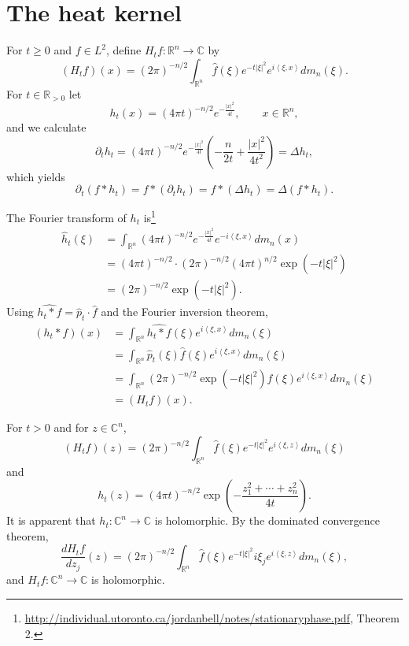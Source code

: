 \documentclass{article}
\newcommand{\inner}[2]{\left\langle #1, #2 \right\rangle}
\theoremstyle{definition}
\begin{document}
\section{The heat kernel}
For $t \geq 0$ and $f \in L^2$, define $H_t f:\mathbb{R}^n \to \mathbb{C}$ by
\[
(H_t f)(x)  = (2\pi)^{-n/2} \int_{\mathbb{R}^n} \widehat{f}(\xi) e^{-t |\xi|^2} e^{i\inner{\xi}{x}} dm_n(\xi).
\]
For $t \in \mathbb{R}_{>0}$ let
\[
h_t(x) = (4\pi t)^{-n/2} e^{-\frac{|x|^2}{4t}},\qquad x \in \mathbb{R}^n,
\]
and we calculate
\[
\partial_t h_t = (4\pi t)^{-n/2} e^{-\frac{|x|^2}{4t}} \left( -\frac{n}{2t}+\frac{|x|^2}{4t^2}\right)
=\Delta h_t,
\]
which yields
\[
\partial_t ( f* h_t) = f*(\partial_t h_t) = f*(\Delta h_t)
=\Delta (f*h_t).
\]

The Fourier transform of $h_t$ is\footnote{\url{http://individual.utoronto.ca/jordanbell/notes/stationaryphase.pdf}, 
Theorem 2.}
\begin{align*}
\widehat{h}_t(\xi)&= \int_{\mathbb{R}^n} (4\pi t)^{-n/2}
e^{-\frac{|x|^2}{4t}} e^{-i\inner{\xi}{x}} dm_n(x)\\
&=(4\pi t)^{-n/2} \cdot (2\pi)^{-n/2} (4\pi t)^{n/2} \exp(-t|\xi|^2)\\
&=(2\pi)^{-n/2} \exp(-t|\xi|^2).
\end{align*}
Using $\widehat{h_t*f}= \widehat{p}_t \cdot \widehat{f}$ and the Fourier inversion theorem,
\begin{align*}
(h_t*f)(x)&= \int_{\mathbb{R}^n} \widehat{h_t*f}(\xi)e^{i\inner{\xi}{x}} dm_n(\xi)\\
&=\int_{\mathbb{R}^n} \widehat{p}_t(\xi) \widehat{f}(\xi) e^{i\inner{\xi}{x}} dm_n(\xi)\\
&=\int_{\mathbb{R}^n} (2\pi)^{-n/2} \exp(-t|\xi|^2) \widehat{f}(\xi) e^{i\inner{\xi}{x}} dm_n(\xi)\\
&=(H_t f)(x).
\end{align*}

For $t>0$ and for $z \in \mathbb{C}^n$,
\[
(H_t f)(z) = (2\pi)^{-n/2} \int_{\mathbb{R}^n} \widehat{f}(\xi) e^{-t|\xi|^2} e^{i\inner{\xi}{z}} dm_n(\xi)
\]
and
\[
h_t(z) = (4\pi t)^{-n/2} \exp\left(-\frac{z_1^2+\cdots+z_n^2}{4t}\right).
\]
It is apparent that $h_t:\mathbb{C}^n \to \mathbb{C}$ is holomorphic. 
By the dominated convergence theorem,
\[
\frac{d H_t f}{dz_j} (z) = (2\pi)^{-n/2} \int_{\mathbb{R}^n} \widehat{f}(\xi) e^{-t|\xi|^2} i\xi_j e^{i\inner{\xi}{z}} dm_n(\xi),
\]
and $H_t f:\mathbb{C}^n \to \mathbb{C}$ is holomorphic. 
\end{document}

